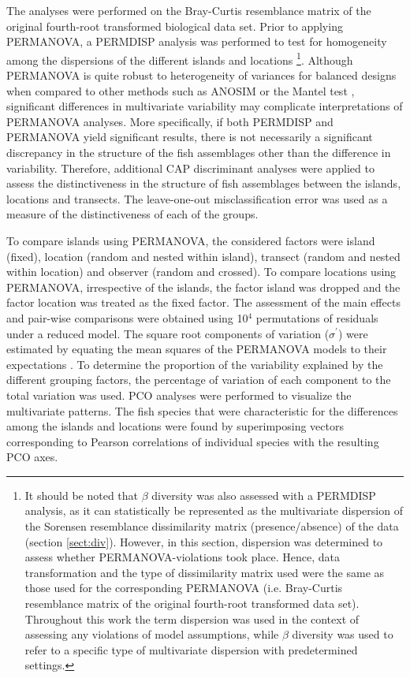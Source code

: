 The analyses were performed on the Bray-Curtis resemblance matrix of the original fourth-root transformed biological data set. Prior to applying PERMANOVA, a PERMDISP analysis was performed to test for homogeneity among the dispersions of the different islands and locations \citep{Anderson2015}\footnote{It should be noted that $\beta$ diversity was also assessed with a PERMDISP analysis, as it can statistically be represented as the multivariate dispersion of the Sorensen resemblance dissimilarity matrix (presence/absence) of the data (section \ref{sect:div}). However, in this section, dispersion was determined to assess whether PERMANOVA-violations took place. Hence, data transformation and the type of dissimilarity matrix used were the same as those used for the corresponding PERMANOVA (i.e. Bray-Curtis resemblance  matrix  of  the  original  fourth-root transformed data set). Throughout this work the term dispersion was used in the context of assessing any violations of model assumptions, while $\beta$ diversity was used to refer to a specific type of multivariate dispersion with predetermined settings.}. Although PERMANOVA is quite robust to heterogeneity of variances for balanced designs when compared to other methods such as ANOSIM or the Mantel test \citep{Anderson2016}, significant differences in multivariate variability may complicate interpretations of PERMANOVA analyses. More specifically, if both PERMDISP and PERMANOVA yield significant results, there is not necessarily a significant discrepancy in the structure of the fish assemblages other than the difference in variability. Therefore, additional CAP discriminant analyses were applied to assess the distinctiveness in the structure of fish assemblages between the islands, locations and transects. The leave-one-out misclassification error was used as a measure of the distinctiveness of each of the groups.

To compare islands using PERMANOVA, the considered factors were island (fixed), location (random and nested within island), transect (random and nested within location) and observer (random and crossed). To compare locations using PERMANOVA, irrespective of the islands, the factor island was dropped and the factor location was treated as the fixed factor. The assessment of the main effects and pair-wise comparisons were obtained using 10$^{4}$ permutations of residuals under a reduced model. The square root components of variation ($\sigma^{'}$) were estimated by equating the mean squares of the PERMANOVA models to their expectations \citep{Anderson2008PERMANOVA+Methods}. To determine the proportion of the variability explained by the different grouping factors, the percentage of variation of each component to the total variation was used. PCO analyses were performed to visualize the multivariate patterns. The fish species that were characteristic for the differences among the islands and locations were found by superimposing vectors corresponding to Pearson correlations of individual species with the resulting PCO axes.

